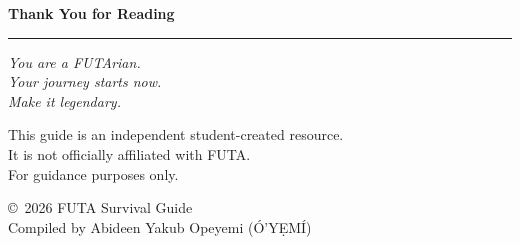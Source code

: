 \documentclass[11pt,a4paper]{article}
\begin{document}
\begin{center}
    \vspace*{3cm}

    {\color{primary}\Huge\bfseries Thank You for Reading}

    \vspace{1cm}

    {\color{accent}\rule{8cm}{2pt}}

    \vspace{1cm}

    {\Large\itshape You are a FUTArian.\\
    Your journey starts now.\\
    Make it legendary.}

    \vspace{2cm}

    {\color{textGray}\small This guide is an independent student-created resource.\\
    It is not officially affiliated with FUTA.\\
    For guidance purposes only.}

    \vfill

    {\color{primary}\copyright\ 2026 FUTA Survival Guide\\
    Compiled by Abideen Yakub Opeyemi (Ó'YẸMÍ)}
\end{center}
\end{document}
